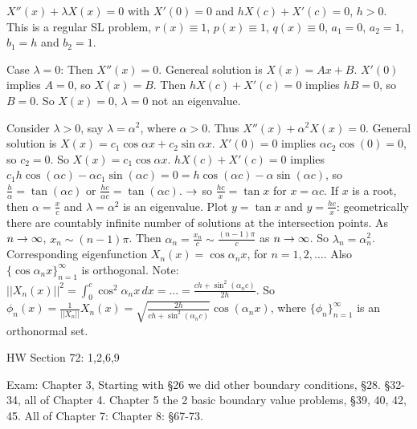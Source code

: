 \documentclass[]{article}
\begin{document}
\begin{example}
	$X''(x) + \lambda X(x) = 0$ with $X'(0) = 0$ and $hX(c) + X'(c) = 0$, $h>0$. This is a regular SL problem, $r(x) \equiv 1$, $p(x) \equiv 1$, $q(x) \equiv 0$, $a_1 = 0$, $a_2 = 1$, $b_1 = h$ and $b_2 = 1$.

	Case $\lambda = 0$: Then $X''(x) = 0$. Genereal solution is $X(x) = Ax+B$. $X'(0)$ implies $A= 0$, so $X(x) = B$. Then $hX(c) + X'(c) = 0$ implies $hB = 0$, so $B = 0$. So $X(x) = 0$, $\lambda = 0$ not an eigenvalue.

	Consider $\lambda>0$, say $\lambda = \alpha^2$, where $\alpha >0$. Thus $X''(x) + \alpha^2 X(x) = 0$. General solution is $X(x) = c_1 \cos{\alpha x} + c_2 \sin{\alpha x}$. $X'(0) = 0$ implies $\alpha c_2 \cos{(0)} = 0$, so $c_2 = 0$. So $X(x) = c_1 \cos{\alpha x}$. $hX(c) + X'(c) = 0$ implies $c_1 h \cos{(\alpha c)} - \alpha c_1 \sin{(\alpha c)} = 0 = h\cos{(\alpha c)} - \alpha \sin{(\alpha c)}$, so $\frac{h}{\alpha} = \tan{(\alpha c)}$ or $\frac{hc}{\alpha c} = \tan{(\alpha c)}$. $\rightarrow$ so $\frac{hc}x = \tan{x}$ for $x = \alpha c$. If $x$ is a root, then $\alpha = \frac{x}{c}$ and $\lambda = \alpha^2$ is an eigenvalue. Plot $y = \tan{x}$ and $y = \frac{hc}{x}$: geometrically there are countably infinite number of solutions at the intersection points. As $n\rightarrow \infty$, $x_n \sim (n-1)\pi$. Then $\alpha_n = \frac{x_n}{c} \sim \frac{(n-1)\pi}{c}$ as $n\rightarrow \infty$. So $\lambda_n = \alpha_n^2$. Corresponding eigenfunction $X_n(x) = \cos{\alpha_n x}$, for $n=1,2,\dots$. Also $\{\cos{\alpha_n x}\}_{n=1}^\infty$ is orthogonal. Note: $||X_n(x)||^2 = \int_0^c \cos^2{\alpha_n x}\, dx = \dots = \frac{ch + \sin^2{(\alpha_n c)}}{2h}$. So $\phi_n(x) = \frac{1}{||X_n||} X_n(x) = \sqrt{\frac{ 2h}{ch + \sin^2{(\alpha_n c)}}}\cos{(\alpha_n x)}$, where $\{\phi_n\}_{n=1}^\infty$ is an orthonormal set.
\end{example}

HW Section 72: 1,2,6,9

Exam: Chapter 3, Starting with \S26 we did other boundary conditions, \S28. \S32-34, all of Chapter 4. Chapter 5 the 2 basic boundary value problems, \S39, 40, 42, 45. All of Chapter 7: Chapter 8: \S67-73.
\end{document}
